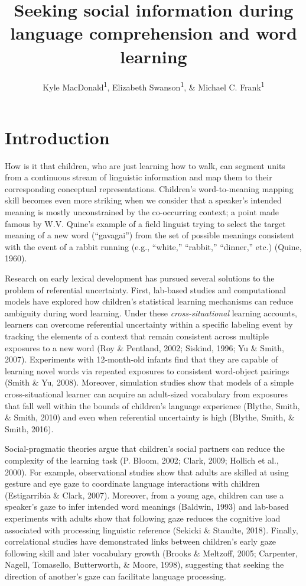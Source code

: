 \documentclass[man,floatsintext]{apa6}
\title{Seeking social information during language comprehension and word
learning}
\author{Kyle MacDonald\textsuperscript{1}, Elizabeth Swanson\textsuperscript{1},
\& Michael C. Frank\textsuperscript{1}}
\date{}
\affiliation{
\vspace{0.5cm}
\textsuperscript{1} Stanford University}
\begin{document}
\maketitle

\section{Introduction}\label{introduction}

How is it that children, who are just learning how to walk, can segment
units from a continuous stream of linguistic information and map them to
their corresponding conceptual representations. Children's
word-to-meaning mapping skill becomes even more striking when we
consider that a speaker's intended meaning is mostly unconstrained by
the co-occurring context; a point made famous by W.V. Quine's example of
a field linguist trying to select the target meaning of a new word
(\enquote{gavagai}) from the set of possible meanings consistent with
the event of a rabbit running (e.g., \enquote{white,} \enquote{rabbit,}
\enquote{dinner,} etc.) (Quine, 1960).

Research on early lexical development has pursued several solutions to
the problem of referential uncertainty. First, lab-based studies and
computational models have explored how children's statistical learning
mechanisms can reduce ambiguity during word learning. Under these
\emph{cross-situational} learning accounts, learners can overcome
referential uncertainty within a specific labeling event by tracking the
elements of a context that remain consistent across multiple exposures
to a new word (Roy \& Pentland, 2002; Siskind, 1996; Yu \& Smith, 2007).
Experiments with 12-month-old infants find that they are capable of
learning novel words via repeated exposures to consistent word-object
pairings (Smith \& Yu, 2008). Moreover, simulation studies show that
models of a simple cross-situational learner can acquire an adult-sized
vocabulary from exposures that fall well within the bounds of children's
language experience (Blythe, Smith, \& Smith, 2010) and even when
referential uncertainty is high (Blythe, Smith, \& Smith, 2016).

Social-pragmatic theories argue that children's social partners can
reduce the complexity of the learning task (P. Bloom, 2002; Clark, 2009;
Hollich et al., 2000). For example, observational studies show that
adults are skilled at using gesture and eye gaze to coordinate language
interactions with children (Estigarribia \& Clark, 2007). Moreover, from
a young age, children can use a speaker's gaze to infer intended word
meanings (Baldwin, 1993) and lab-based experiments with adults show that
following gaze reduces the cognitive load associated with processing
linguistic reference (Sekicki \& Staudte, 2018). Finally, correlational
studies have demonstrated links between children's early gaze following
skill and later vocabulary growth (Brooks \& Meltzoff, 2005; Carpenter,
Nagell, Tomasello, Butterworth, \& Moore, 1998), suggesting that seeking
the direction of another's gaze can facilitate language processing.
\end{document}
